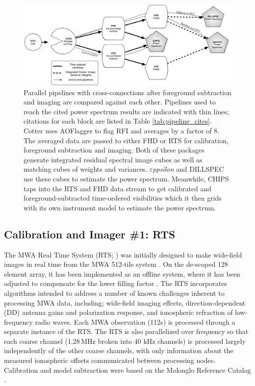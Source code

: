 \documentclass[twolcolumn,iop]{emulateapj}
\def\eppsilon{{\it $\varepsilon$ppsilon}}
\def\empirical{DILLSPEC}
\begin{document}
\begin{figure}[htbp]
\begin{center}
\includegraphics[width=\textwidth]{figures/MWA_Pipes.png}
\caption{Parallel pipelines with cross-connections after foreground subtraction and imaging are compared against each other. Pipelines used to reach the cited power spectrum results are indicated with thin lines; citations for each block are listed in Table \ref{tab:pipeline_cites}. Cotter uses AOFlagger to flag RFI and averages by a factor of 8. The averaged data are passed to either FHD or RTS for calibration, foreground subtraction and imaging. Both of these packages generate integrated residual spectral image cubes as well as matching cubes of weights and variances.  \eppsilon{} and \empirical{} use these cubes to estimate the power spectrum. Meanwhile, CHIPS taps into the RTS and FHD data stream to get calibrated and foreground-subtracted time-ordered  visibilities which it then grids with its own instrument model to estimate the power spectrum. 
}
\label{fig:pipes}
\end{center}
\end{figure}

\subsection{Calibration and Imager \#1: RTS}
\label{sec:RTS}

The MWA Real Time System (RTS; \cite{Mitchell:2008p707,Ord:2010p8442}) was initially designed to make wide-field images in real time from the MWA 512-tile system \citep{Mitchell:2008p707}.  On the de-scoped 128 element array, it has been implemented as an offline system, where it has been adjusted to compensate for the lower filling factor \citep{Ord:2010p8442}.  The RTS incorporates algorithms intended to address a number of known challenges inherent to processing MWA data, including; wide-field imaging effects, direction-dependent (DD) antenna gains and polarization response, and ionospheric refraction of low-frequency radio waves. Each MWA observation (112s) is processed through a separate instance of the RTS. The RTS is also parallelized over frequency so that each coarse channel (1.28\,MHz broken into 40 kHz channels) is processed largely independently of the other coarse channels, with only information about the measured ionospheric offsets communicated between processing nodes.  Calibration and model subtraction were based on the Molonglo Reference Catalog \citep{Large:1981p7798}. 
\end{document}
